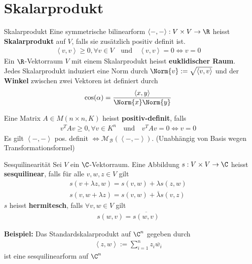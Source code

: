 \section{Skalarprodukt}

\begin{definition}{Skalarprodukt}
    Eine symmetrische bilinearform $\left<-,-\right>: V \times V \to \R$ heisst \textbf{Skalarprodukt} auf $V$, falls sie zusätzlich positiv definit ist.
    \begin{align*}
        \left<v,v\right> \geq 0, \forall v \in V \quad \text{und} \quad \left<v,v\right> = 0 \Leftrightarrow v = 0
    \end{align*}
    Ein $\R$-Vektorraum $V$ mit einem Skalarprodukt heisst \textbf{euklidischer Raum}.
    Jedes Skalarprodukt induziert eine Norm durch $\Norm{v}:= \sqrt{\left<v,v\right>}$ und der \textbf{Winkel} zwischen zwei Vektoren ist definiert durch
    \begin{align*}
        \cos(\alpha) = \frac{\left<x,y\right>}{\Norm{x} \Norm{y}}
    \end{align*}
\end{definition}

Eine Matrix $A \in M(n\times n,K)$ heisst \textbf{positiv-definit}, falls
\begin{align*}
    v^TAv \geq 0, \forall v \in K^n \quad \text{und} \quad v^TAv = 0 \Leftrightarrow v = 0
\end{align*}
Es gilt $\left<-,-\right>$ pos. definit $\Leftrightarrow \mathcal{M}_{\mathcal{B}}(\left<-,-\right>)$. (Unabhängig von Basis wegen Transformationsformel)

\begin{definition}{Sesquilinearität}
    Sei $V$ ein $\C$-Vektorraum. Eine Abbildung $s: V \times V \to \C$ heisst \textbf{sesquilinear}, falls für alle $v,w,z \in V$ gilt
    \begin{align*}
        s(v + \lambda z,w) = s(v,w) + \lambda s(z,w)\\
        s(v, w + \lambda z) = s(v,w) + \overline{\lambda}s(v,z)
    \end{align*}
    $s$ heisst \textbf{hermitesch}, falls $\forall v,w \in V$ gilt
    \begin{align*}
        s(w,v) = \overline{s(w,v)}
    \end{align*}
\end{definition}

\textbf{Beispiel:} \quad Das Standardskalarprodukt auf $\C^n$ gegeben durch
\begin{align*}
    \left<z,w\right> := \sum_{i = 1}^{n} z_i \overline{w_i}
\end{align*}
ist eine sesquilinearform auf $\C^n$

